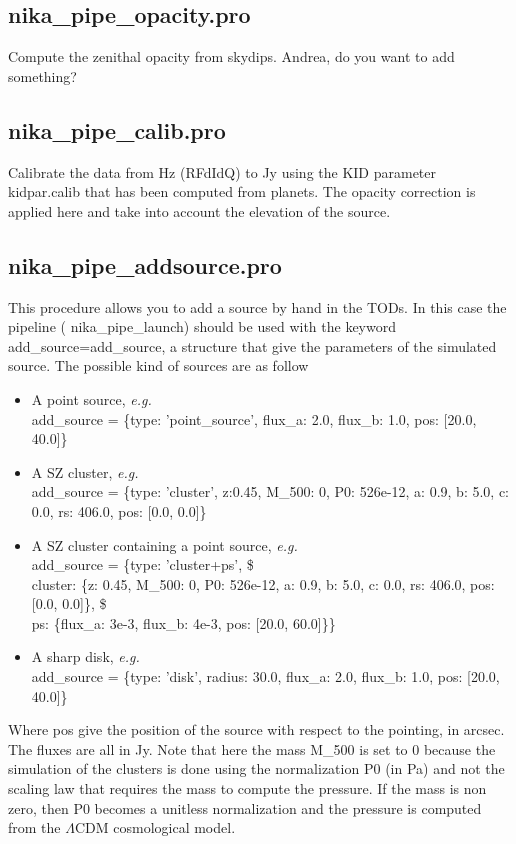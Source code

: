\documentclass[a4paper]{article}
\begin{document}
\subsection{{\color{blue} nika\_pipe\_opacity.pro}}
Compute the zenithal opacity from skydips. {\color{red} Andrea, do you want to add something?}

\subsection{{\color{blue} nika\_pipe\_calib.pro}}
Calibrate the data from Hz (RFdIdQ) to Jy using the KID parameter kidpar.calib that has been computed from planets. The opacity correction is applied here and take into account the elevation of the source.

\subsection{{\color{blue} nika\_pipe\_addsource.pro}}
\label{sec:nika_pipe_addsource}
This procedure allows you to add a source by hand in the TODs. In this case the pipeline ({\color{blue} nika\_pipe\_launch}) should be used with the keyword {\color{blue} add\_source=add\_source}, a structure that give the parameters of the simulated source. The possible kind of sources are as follow 
\begin{itemize}
\item A point source, {\it e.g.} \\
{\color{blue} add\_source = \{type: 'point\_source', flux\_a: 2.0, flux\_b: 1.0, pos: [20.0, 40.0]\}}
\item A SZ cluster, {\it e.g.} \\
{\color{blue} add\_source = \{type: 'cluster', z:0.45, M\_500: 0, P0: 526e-12, a: 0.9, b: 5.0, c: 0.0, rs: 406.0, pos: [0.0, 0.0]\}}
\item A SZ cluster containing a point source, {\it e.g.} \\
{\color{blue} add\_source = \{type: 'cluster+ps', \$ \\
 cluster: \{z: 0.45, M\_500: 0, P0: 526e-12, a: 0.9, b: 5.0, c: 0.0, rs: 406.0, pos: [0.0, 0.0]\}, \$ \\
 ps: \{flux\_a: 3e-3, flux\_b: 4e-3, pos: [20.0, 60.0]\}\}}
\item A sharp disk, {\it e.g.} \\
{\color{blue} add\_source = \{type: 'disk', radius: 30.0, flux\_a: 2.0, flux\_b: 1.0, pos: [20.0, 40.0]\}}
\end{itemize}
Where {\color{blue} pos} give the position of the source with respect to the pointing, in arcsec. The fluxes are all in Jy. Note that here the mass {\color{blue} M\_500} is set to 0 because the simulation of the clusters is done using the normalization {\color{blue} P0} (in Pa) and not the scaling law that requires the mass to compute the pressure. If the mass is non zero, then {\color{blue} P0} becomes a unitless normalization and the pressure is computed from the $\Lambda$CDM cosmological model. 
\end{document}

